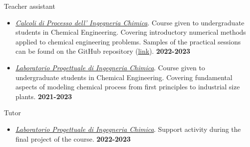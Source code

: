 \begin{position_simple}{Teacher assistant}{\polimi}
\begin{itemize}
    \item[ ] \ul{\it Calcoli di Processo dell' Ingegneria Chimica}. Course given to
       undergraduate students in Chemical Engineering. Covering introductory numerical
       methods applied to chemical engineering problems. Samples of the practical sessions
       can be found on the GitHub repository
       (\href{https://github.com/Titodinelli/Calcoli-di-Processo-dell-Ingegneria-Chimica}{link}).
       \hfill {\bf 2022-2023}

    \item[ ] \ul{\it Laboratorio Progettuale di Ingegneria Chimica}. Course given to
       undergraduate students in Chemical Engineering. Covering fundamental aspects of
       modeling chemical process from first principles to industrial size plants. \hfill
       {\bf 2021-2023}
\end{itemize}
\end{position_simple}

\begin{position_simple}{Tutor}{\polimi}
\begin{itemize}
    \item[ ] \ul{\it Laboratorio Progettuale di Ingegneria Chimica}. Support activity
       during the final project of the course. \hfill {\bf 2022-2023}
\end{itemize}
\end{position_simple}
